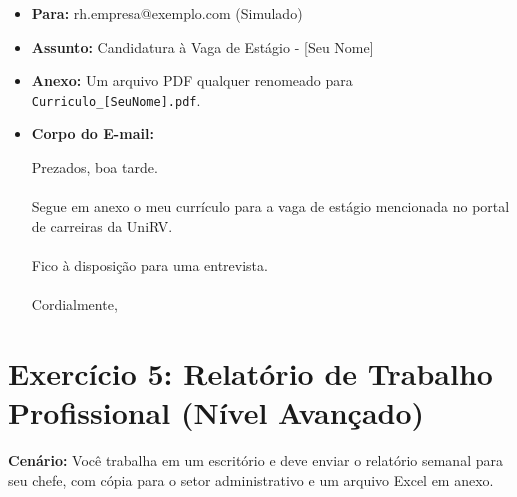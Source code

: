\documentclass[12pt,a4paper]{article}
\begin{document}
\begin{itemize}[label=$\square$]
    \item \textbf{Para:} rh.empresa@exemplo.com (Simulado)
    \item \textbf{Assunto:} Candidatura à Vaga de Estágio - [Seu Nome]
    \item \textbf{Anexo:} Um arquivo PDF qualquer renomeado para \texttt{Curriculo\_[SeuNome].pdf}.
    \item \textbf{Corpo do E-mail:}
    \begin{tcolorbox}[colback=gray!5, colframe=gray!50]
        Prezados, boa tarde.\\
        \\
        Segue em anexo o meu currículo para a vaga de estágio mencionada no portal de carreiras da UniRV.\\
        \\
        Fico à disposição para uma entrevista.\\
        \\
        Cordialmente,\\ 
    \end{tcolorbox}
\end{itemize}

\section*{Exercício 5: Relatório de Trabalho Profissional (Nível Avançado)}

\textbf{Cenário:} Você trabalha em um escritório e deve enviar o relatório semanal para seu chefe, com cópia para o setor administrativo e um arquivo Excel em anexo.
\end{document}
